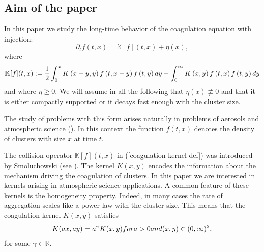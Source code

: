 \documentclass[11pt]{article}
\numberwithin{equation}{section}
\theoremstyle{plain}
\newcommand{\der}{\textup{d}}
\begin{document}
\subsection{Aim of the paper} 
In this paper we study the long-time behavior of the coagulation equation with injection:
\begin{equation} \label{eq:coag with inj} 
\partial_{t}f\left( t, x\right)  =\mathbb{K}[f](t,x)+\eta\left(  x\right),
\end{equation}
where
\begin{equation}\label{coagulation-kernel-def}
 \mathbb{K}[f](t,x):=\frac{1}{2}\int_{0}^{x}K\left(  x-y,y\right)
f\left( t, x-y\right)  f\left(t,  y\right)  \der y-\int_{0}^{\infty}K\left(
x,y\right)  f\left(t,  x\right)  f\left( t, y\right)  \der y
\end{equation}
and where $\eta\geq 0$. We will assume in all the following that $\eta(x) \not\equiv 0$ and that it is either compactly supported or it decays fast enough with the cluster size.
 
The study of problems with this form arises naturally in problems of aerosols and atmospheric science (\cite{Friedlander,Vehkamaki+others,Vehkamaki}). In this context the function $f(t,x)$ denotes
the density of clusters with size $x$ at time $t$.

The collision operator $\mathbb{K}[f](t,x)$ in (\ref{coagulation-kernel-def}) was introduced by Smoluchowski (see \cite{Smoluchowski}). The kernel $K(x,y)$ encodes the information about the mechanism driving the coagulation of clusters. 
In this paper we are interested in kernels arising in atmospheric science applications. A common feature of these kernels is the homogeneity property. Indeed, in many cases the rate of aggregation scales like a power law with the cluster size. This means that the coagulation kernel $K(x,y)$ satisfies
\begin{equation}\label{kernel-homogeneity}
    K(a x,a y)=a^{\gamma}K(x,y) \textup{ for } a >0 \textup{ and } (x,y)\in\mathbb(0,\infty)^{2},
\end{equation}
for some $\gamma\in\mathbb{R}$. 
\end{document}
